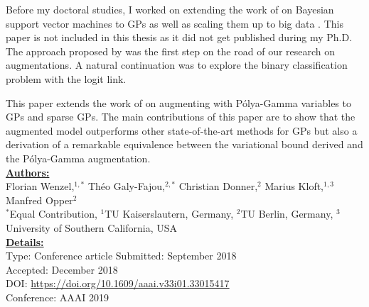 


\graphicspath{{3/figures/}}

Before my doctoral studies, I worked on extending the work of \citet{henaoBayesianNonlinearSupport2014} on Bayesian support vector machines to \acp{GP} as well as scaling them up to big data \cite{wenzel2017bayesian}.
This paper is not included in this thesis as it did not get published during my Ph.D.
The approach proposed by \citet{henaoBayesianNonlinearSupport2014} was the first step on the road of our research on augmentations.
A natural continuation was to explore the binary classification problem with the logit link.

This paper extends the work of \citet{polsonBayesianInferenceLogistic2012} on augmenting with P\'olya-Gamma variables to \acp{GP} and sparse \acp{GP}.
The main contributions of this paper are to show that the augmented model outperforms other state-of-the-art methods for \acp{GP} but also a derivation of a remarkable equivalence between the variational bound derived \citet{jaakkolaBayesianParameterEstimation2000} and the P\'olya-Gamma augmentation.\\

\textbf{\underline{Authors:}}\\
Florian Wenzel,$^{1,*}$ Th\'eo Galy-Fajou,$^{2,*}$ Christian Donner,$^{2}$ Marius Kloft,$^{1,3}$ Manfred Opper$^2$\\
\small{$^*$Equal Contribution, $^1$TU Kaiserslautern, Germany, $^2$TU Berlin, Germany, $^3$University of Southern California, USA}\\

\textbf{\underline{Details:}}\\
Type: Conference article
Submitted: September 2018\\
Accepted: December 2018\\
DOI: \url{https://doi.org/10.1609/aaai.v33i01.33015417}\\
Conference: AAAI 2019\\

